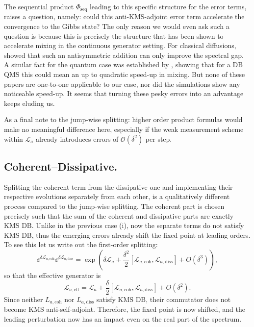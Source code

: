 The sequential product $\Phi_\text{seq}$ leading to this specific structure for the error terms, raises a question, namely: could this anti-KMS-adjoint error term accelerate the convergence to the Gibbs state? The only reason we would even ask such a question is because this is precisely the structure that has been shown to accelerate mixing in the continuous generator setting. For classical diffusions, \cite{hwang2005accelerating} showed that such an antisymmetric addition can only improve the spectral gap. A similar fact for the quantum case was established by \cite{li2025speeding}, showing that for a DB QMS this could mean an up to quadratic speed-up in mixing. But none of these papers are one-to-one applicable to our case, nor did the simulations show any noticeable speed-up. It seems that turning these pesky errors into an advantage keeps eluding us.

As a final note to the jump-wise splitting: higher order product formulas would make no meaningful difference here, especially if the weak measurement scheme within $\mathcal{L}_a$ already introduces errors of $\mathcal{O}(\delta^2)$ per step.

\medskip
\label{sec:ckg-coh-diss-split}
\subsection{Coherent--Dissipative.}
Splitting the coherent term from the dissipative one and implementing their respective evolutions separately from each other, is a qualitatively different process compared to the jump-wise splitting. The coherent part is chosen precisely such that the sum of the coherent and dissipative parts are exactly KMS DB. Unlike in the previous case (i), now the separate terms do not satisfy KMS DB, thus the emerging errors already shift the fixed point at leading orders. To see this let us write out the first-order splitting:
\begin{equation}
    \ee^{\delta \mathcal L_{a,\mathrm{coh}}}\ee^{\delta \mathcal L_{a,\mathrm{diss}}}
    = \exp\!\left(
        \delta \mathcal L_a
        + \frac{\delta^2}{2}[\mathcal L_{a,\mathrm{coh}},\mathcal L_{a,\mathrm{diss}}]
        + O(\delta^3)
    \right),
\end{equation}
so that the effective generator is 
\begin{equation} \label{eq:gen-split-coh-diss}
    \mathcal L_{a,\mathrm{eff}}
    = \mathcal L_a
    + \frac{\delta}{2}[\mathcal L_{a,\mathrm{coh}},\mathcal L_{a,\mathrm{diss}}]
    + O(\delta^2).
\end{equation}
Since neither $L_{a,\mathrm{coh}}$ nor $L_{a,\mathrm{diss}}$ satisfy KMS DB, their commutator does not become KMS anti-self-adjoint. Therefore, the fixed point is now shifted, and the leading perturbation now has an impact even on the real part of the spectrum. 

